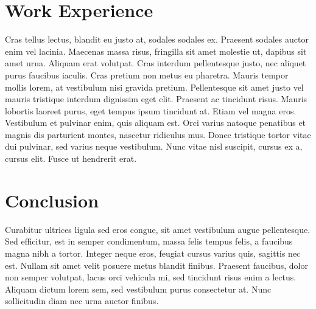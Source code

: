 \documentclass[12pt, letterpaper]{article}
\begin{document}
\section*{Work Experience}
Cras tellus lectus, blandit eu justo at, sodales sodales ex. Praesent sodales auctor enim vel lacinia. Maecenas massa risus, fringilla sit amet molestie ut, dapibus sit amet urna. Aliquam erat volutpat. Cras interdum pellentesque justo, nec aliquet purus faucibus iaculis. Cras pretium non metus eu pharetra. Mauris tempor mollis lorem, at vestibulum nisi gravida pretium. Pellentesque sit amet justo vel mauris tristique interdum dignissim eget elit. Praesent ac tincidunt risus. Mauris lobortis laoreet purus, eget tempus ipsum tincidunt at. Etiam vel magna eros. Vestibulum et pulvinar enim, quis aliquam est. Orci varius natoque penatibus et magnis dis parturient montes, nascetur ridiculus mus. Donec tristique tortor vitae dui pulvinar, sed varius neque vestibulum. Nunc vitae nisl suscipit, cursus ex a, cursus elit. Fusce ut hendrerit erat. 

\section*{Conclusion}
Curabitur ultrices ligula sed eros congue, sit amet vestibulum augue pellentesque. Sed efficitur, est in semper condimentum, massa felis tempus felis, a faucibus magna nibh a tortor. Integer neque eros, feugiat cursus varius quis, sagittis nec est. Nullam sit amet velit posuere metus blandit finibus. Praesent faucibus, dolor non semper volutpat, lacus orci vehicula mi, sed tincidunt risus enim a lectus. Aliquam dictum lorem sem, sed vestibulum purus consectetur at. Nunc sollicitudin diam nec urna auctor finibus.
\end{document}
